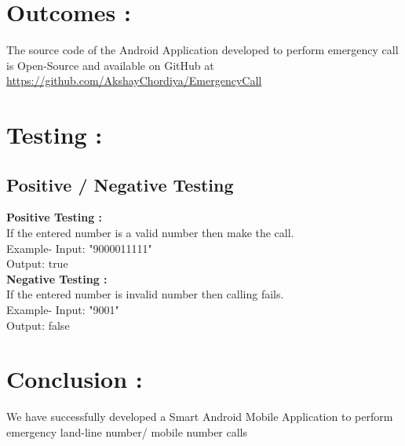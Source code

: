 \documentclass{article}
\begin{document}
\section{Outcomes :}
The source code of the Android Application developed to perform emergency call is Open-Source and available on GitHub at \url{https://github.com/AkshayChordiya/EmergencyCall}


\section{Testing :}

\subsection {Positive / Negative Testing}

\textbf{Positive Testing :}\\
If the entered number is a valid number then make the call.\\
Example- Input: "9000011111" \\
		 Output: true\\

\textbf{ Negative Testing :}\\
If the entered number is invalid number then calling fails.\\
Example- Input: "9001" \\
		 Output: false\\

\section{Conclusion : }

We have successfully developed a Smart Android Mobile Application to perform emergency land-line number/ mobile number calls
\end{document}

